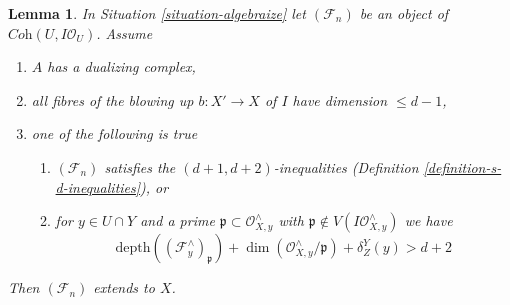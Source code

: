 \documentclass{stacks-project}
\theoremstyle{plain}
\newtheorem{lemma}[subsection]{Lemma}
\theoremstyle{definition}
\theoremstyle{remark}
\numberwithin{equation}{subsection}
\begin{document}
\begin{lemma}
\label{lemma-blowup}
In Situation \ref{situation-algebraize} let $(\mathcal{F}_n)$
be an object of $\textit{Coh}(U, I\mathcal{O}_U)$. Assume
\begin{enumerate}
\item $A$ has a dualizing complex,
\item all fibres of the blowing up $b : X' \to X$ of $I$
have dimension $\leq d - 1$,
\item one of the following is true
\begin{enumerate}
\item $(\mathcal{F}_n)$ satisfies the $(d + 1, d + 2)$-inequalities
(Definition \ref{definition-s-d-inequalities}), or
\item for $y \in U \cap Y$ and a prime
$\mathfrak p \subset \mathcal{O}_{X, y}^\wedge$ with
$\mathfrak p \not \in V(I\mathcal{O}_{X, y}^\wedge)$
we have
$$
\text{depth}((\mathcal{F}^\wedge_y)_\mathfrak p) +
\dim(\mathcal{O}_{X, y}^\wedge/\mathfrak p) + \delta^Y_Z(y) > d + 2
$$
\end{enumerate}
\end{enumerate}
Then $(\mathcal{F}_n)$ extends to $X$.
\end{lemma}
\end{document}
